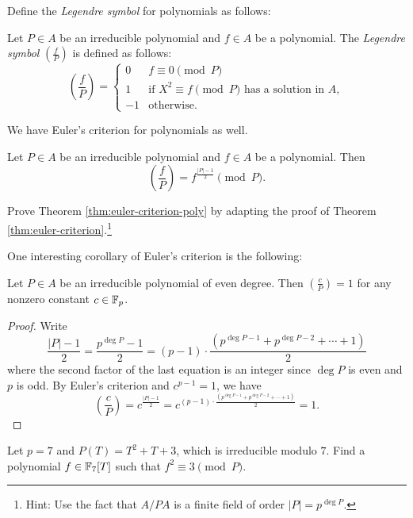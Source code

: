 Define the \emph{Legendre symbol} for polynomials as follows:
\begin{definition}
    Let $P \in A$ be an irreducible polynomial and $f \in A$ be a polynomial.
    The \emph{Legendre symbol} $\left(\frac{f}{P}\right)$ is defined as follows:
    \begin{equation}
        \left(\frac{f}{P}\right) = \begin{cases}
            0 & f \equiv 0 \pmod{P} \\
            1 & \text{if } X^2 \equiv f \pmod{P} \text{ has a solution in } A, \\
            -1 & \text{otherwise.}
        \end{cases}
        \label{eqn:legendre-symbol-poly}
    \end{equation}
\end{definition}

We have Euler's criterion for polynomials as well.
\begin{theorem}
    \label{thm:euler-criterion-poly}
    Let $P \in A$ be an irreducible polynomial and $f \in A$ be a polynomial.
    Then
    \begin{equation}
        \left(\frac{f}{P}\right) = f^{\frac{|P| - 1}{2}} \pmod{P}.
        \label{eqn:euler-criterion-poly}
    \end{equation}
\end{theorem}

\begin{exercise}
    Prove Theorem \ref{thm:euler-criterion-poly} by adapting the proof of Theorem \ref{thm:euler-criterion}.\footnote{Hint: Use the fact that $A / P A$ is a finite field of order $|P| = p^{\deg P}$.}
\end{exercise}
One interesting corollary of Euler's criterion is the following:
\begin{corollary}
    \label{cor:even-deg-qr}
    Let $P \in A$ be an irreducible polynomial of even degree.
    Then $\left(\frac{c}{P}\right) = 1$ for any nonzero constant $c \in \mathbb{F}_p$.
\end{corollary}
\begin{proof}
    Write
    \[
    \frac{|P| - 1}{2} = \frac{p^{\deg P} - 1}{2} = (p-1) \cdot \frac{(p^{\deg P - 1} + p^{\deg P - 2} + \cdots + 1)}{2}
    \]
    where the second factor of the last equation is an integer since $\deg P$ is even and $p$ is odd.
    By Euler's criterion and $c^{p-1} = 1$, we have
    \[
    \left(\frac{c}{P}\right) = c^{\frac{|P| - 1}{2}} = c^{(p-1) \cdot \frac{(p^{\deg P - 1} + p^{\deg P - 2} + \cdots + 1)}{2}} = 1.
    \]
\end{proof}
\begin{exercise}
    Let $p = 7$ and $P(T) = T^2 + T + 3$, which is irreducible modulo $7$.
    Find a polynomial $f \in \mathbb{F}_7[T]$ such that $f^2 \equiv 3 \pmod{P}$.
\end{exercise}

